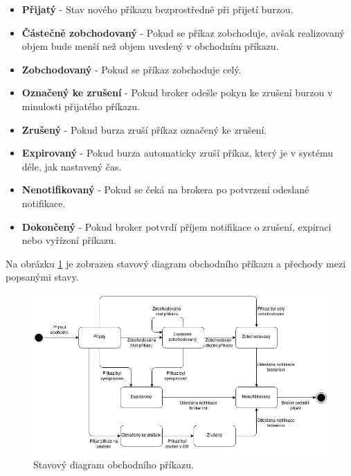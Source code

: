 \documentclass[thesis=M,czech]{FITthesis}[2012/06/26]
\begin{document}
\begin{itemize}

\item \textbf{Přijatý} - Stav nového příkazu bezprostředně při přijetí burzou.


\item \textbf{Částečně zobchodovaný} - Pokud se příkaz zobchoduje, avšak realizovaný objem bude menší než objem uvedený v obchodním příkazu.

\item \textbf{Zobchodovaný} - Pokud se příkaz zobchoduje celý.

\item \textbf{Označený ke zrušení} - Pokud broker odešle pokyn ke zrušení burzou v minulosti přijatého příkazu.

\item \textbf{Zrušený} - Pokud burza zruší příkaz označený ke zrušení.

\item \textbf{Expirovaný} - Pokud burza automaticky zruší příkaz, který je v systému déle, jak nastavený čas.

\item \textbf{Nenotifikovaný} - Pokud se čeká na brokera po potvrzení odeslané notifikace.

\item \textbf{Dokončený} - Pokud broker potvrdí příjem notifikace o zrušení, expiraci nebo vyřízení příkazu.

\end{itemize}

	Na obrázku \ref{fig:order_state_diagram} je zobrazen stavový diagram obchodního příkazu a přechody mezi popsanými stavy.

\begin{figure}[h]
	\centering
	\includegraphics[width=1\textwidth]{images/order_states}
 	\caption[Stavový diagram obchodního příkazu]{Stavový diagram obchodního příkazu.}
 	\label{fig:order_state_diagram}
\end{figure}
\end{document}
